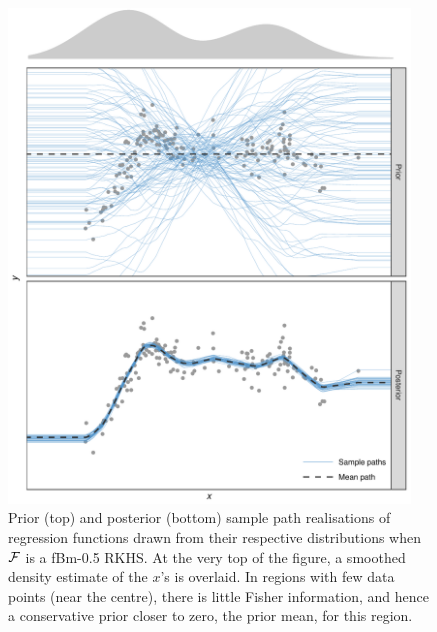 \begin{figure}[p]
  \centering
  \includegraphics[width=0.95\textwidth]{figure/04-post_reg_prior_post}
  \caption[Prior and posterior sample path realisations]{Prior (top) and posterior (bottom) sample path realisations of regression functions drawn from their respective distributions when ${\mathcal F}$ is a fBm-0.5 RKHS. At the very top of the figure, a smoothed density estimate of the $x$'s is overlaid. In regions with few data points (near the centre), there is little Fisher information, and hence a conservative prior closer to zero, the prior mean, for this region.}
\end{figure}

